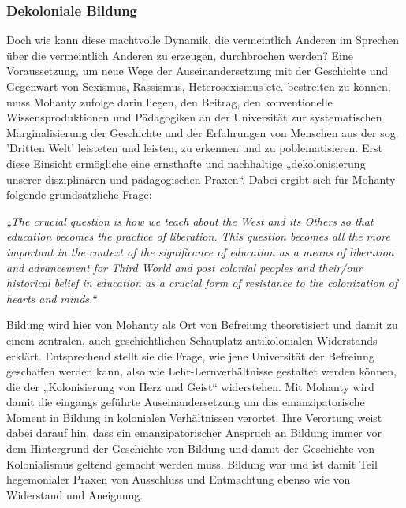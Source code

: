 \subsubsection{Dekoloniale Bildung}

Doch wie kann diese machtvolle Dynamik, die vermeintlich Anderen im Sprechen
über die vermeintlich Anderen zu erzeugen, durchbrochen werden? Eine
Voraussetzung, um neue Wege der Auseinandersetzung mit der Geschichte und
Gegenwart von Sexismus, Rassismus, Heterosexismus etc. bestreiten zu können,
muss Mohanty zufolge darin liegen, den Beitrag, den konventionelle
Wissensproduktionen und Pädagogiken an der Universität zur systematischen
Marginalisierung der Geschichte und der Erfahrungen von Menschen aus der sog.
'Dritten Welt' leisteten und leisten, zu erkennen und zu poblematisieren. Erst
diese Einsicht ermögliche eine ernsthafte und nachhaltige „dekolonisierung
unserer disziplinären und pädagogischen Praxen“\footnotemark{}. Dabei ergibt sich für Mohanty
folgende grundsätzliche Frage:

\begin{myenv}
  \textit{„The crucial question is how we teach about the West and its Others
    so that education becomes the practice of liberation. This question becomes
    all the more important in the context of the significance of education as a
    means of liberation and advancement for Third World and post colonial
    peoples and their/our historical belief in education as a crucial form of
    resistance to the colonization of hearts and minds.“\footnotemark
    }
\end{myenv}

Bildung wird hier von Mohanty als Ort von Befreiung theoretisiert und damit zu
einem zentralen, auch geschichtlichen Schauplatz antikolonialen Widerstands
erklärt. Entsprechend stellt sie die Frage, wie jene Universität der Befreiung
geschaffen werden kann, also wie Lehr-Lernverhältnisse gestaltet werden können,
die der „Kolonisierung von Herz und Geist“\footnotemark{} widerstehen.  Mit Mohanty wird
damit die eingangs geführte Auseinandersetzung um das emanzipatorische Moment
in Bildung in kolonialen Verhältnissen verortet. Ihre Verortung weist dabei
darauf hin, dass ein emanzipatorischer Anspruch an Bildung immer vor dem
Hintergrund der Geschichte von Bildung und damit der Geschichte von Kolonialismus geltend gemacht werden muss. Bildung  war und ist damit Teil hegemonialer Praxen von Ausschluss und Entmachtung ebenso wie von Widerstand und Aneignung.

